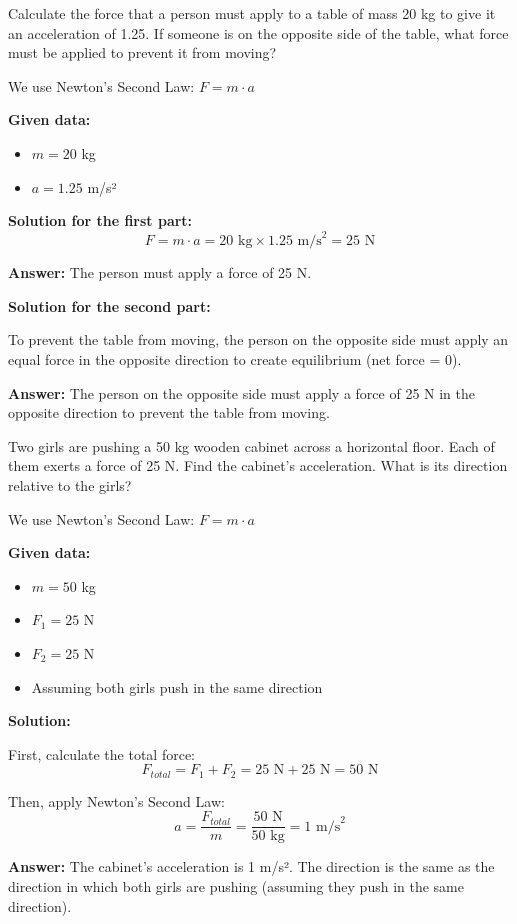 \begin{exercise}
    Calculate the force that a person must apply to a table of mass 20 kg to give it an acceleration of \qty{1.25}{\mpss}.
    If someone is on the opposite side of the table, what force must be applied to prevent it from moving?

    \begin{solu}
        We use Newton's Second Law: $F = m \cdot a$

        \textbf{Given data:}
        \begin{itemize}
            \item $m = 20$ kg
            \item $a = 1.25$ m/s²
        \end{itemize}

        \textbf{Solution for the first part:}
        $$F = m \cdot a = 20\text{ kg} \times 1.25\text{ m/s}^2 = 25\text{ N}$$

        \textbf{Answer:} The person must apply a force of 25 N.

        \textbf{Solution for the second part:}

        To prevent the table from moving, the person on the opposite side must apply an equal force in the opposite direction to create equilibrium (net force = 0).

        \textbf{Answer:} The person on the opposite side must apply a force of 25 N in the opposite direction to prevent the table from moving.
    \end{solu}
\end{exercise}

\begin{exercise}
    Two girls are pushing a 50 kg wooden cabinet across a horizontal floor.
    Each of them exerts a force of 25 N. Find the cabinet's acceleration.
    What is its direction relative to the girls?

    \begin{solu}
        We use Newton's Second Law: $F = m \cdot a$

        \textbf{Given data:}
        \begin{itemize}
            \item $m = 50$ kg
            \item $F_1 = 25$ N
            \item $F_2 = 25$ N
            \item Assuming both girls push in the same direction
        \end{itemize}

        \textbf{Solution:}

        First, calculate the total force:
        $$F_{total} = F_1 + F_2 = 25\text{ N} + 25\text{ N} = 50\text{ N}$$

        Then, apply Newton's Second Law:
        $$a = \frac{F_{total}}{m} = \frac{50\text{ N}}{50\text{ kg}} = 1\text{ m/s}^2$$

        \textbf{Answer:} The cabinet's acceleration is 1 m/s². The direction is the same as the direction in which both girls are pushing (assuming they push in the same direction).
    \end{solu}
\end{exercise}

